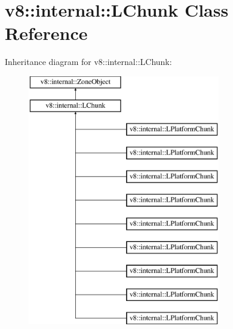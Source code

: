 \hypertarget{classv8_1_1internal_1_1_l_chunk}{}\section{v8\+:\+:internal\+:\+:L\+Chunk Class Reference}
\label{classv8_1_1internal_1_1_l_chunk}
Inheritance diagram for v8\+:\+:internal\+:\+:L\+Chunk\+:\begin{figure}[H]
\begin{center}
\leavevmode
\includegraphics[height=11.000000cm]{classv8_1_1internal_1_1_l_chunk}
\end{center}
\end{figure}
